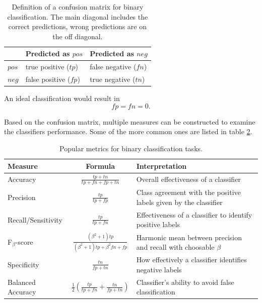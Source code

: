 \begin{table}
    \caption{Definition of a confusion matrix for binary classification.
    The main diagonal includes the correct predictions, wrong predictions are on the off diagonal.}
    \begin{center}
        \begin{tabular}{ l| l l}
            {} & Predicted as $pos$ & Predicted as $neg$ \\
            \hline
            $pos$ & true positive ($tp$) & false negative ($fn$) \\
            $neg$ & false positive ($fp$) & true negative ($tn$) \\
        \end{tabular}
    \end{center}
    \label{tab:confusion}
\end{table}

An ideal classification would result in
\begin{equation*}
  fp = fn = 0.
\end{equation*}

Based on the confusion matrix, multiple measures
can be constructed to examine the classifiers performance.
Some of the more common ones are listed in table \ref{tab:class_metrics}.

\begin{table}
    \caption{Popular metrics for binary classification tasks.}
    \begin{center}
        \begin{tabularx}{\textwidth}{l c X}
            Measure & Formula & Interpretation \\
            \hline
            Accuracy & $\frac{tp+tn}{tp+fn+fp+tn}$ & Overall effectiveness of a classifier \\
            Precision & $\frac{tp}{tp+fp}$ & Class agreement with the positive labels given by the classifier \\
            Recall/Sensitivity & $\frac{tp}{tp+fn}$ & Effectiveness of a classifier to identify positive labels \\
            F$_{\beta}$-score & $\frac{(\beta^2+1)tp}{(\beta^2+1)tp+\beta^2fn+fp}$ & Harmonic mean between precision and recall with choosable $\beta$ \\
            Specificity & $\frac{tn}{fp+tn}$ & How effectively a classifier identifies negative labels \\
            Balanced Accuracy & $\frac{1}{2}(\frac{tp}{tp+fn}+\frac{tn}{fp+tn})$ & Classifier’s ability to avoid false classification \\
        \end{tabularx}
    \end{center}
    \label{tab:class_metrics}
\end{table}

